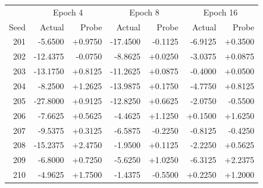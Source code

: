 \begin{tabular}{r rr rr rr}
\toprule
& \multicolumn{2}{c}{Epoch 4} & \multicolumn{2}{c}{Epoch 8} & \multicolumn{2}{c}{Epoch 16} \\
Seed & Actual & Probe & Actual & Probe & Actual & Probe \\
\midrule
201 & -5.6500 & +0.9750 & -17.4500 & -0.1125 & -6.9125 & +0.3500 \\
202 & -12.4375 & -0.0750 & -8.8625 & +0.0250 & -3.0375 & +0.0875 \\
203 & -13.1750 & +0.8125 & -11.2625 & +0.0875 & -0.4000 & +0.0500 \\
204 & -8.2500 & +1.2625 & -13.9875 & +0.1750 & -4.7750 & +0.8125 \\
205 & -27.8000 & +0.9125 & -12.8250 & +0.6625 & -2.0750 & -0.5500 \\
206 & -7.6625 & +0.5625 & -4.4625 & +1.1250 & +0.1500 & +1.6250 \\
207 & -9.5375 & +0.3125 & -6.5875 & -0.2250 & -0.8125 & -0.4250 \\
208 & -15.2375 & +2.4750 & -1.9500 & +0.1125 & -2.2250 & +0.5625 \\
209 & -6.8000 & +0.7250 & -5.6250 & +1.0250 & -6.3125 & +2.2375 \\
210 & -4.9625 & +1.7500 & -1.4375 & -0.5500 & +0.2250 & +1.2000 \\
\bottomrule
\end{tabular}
